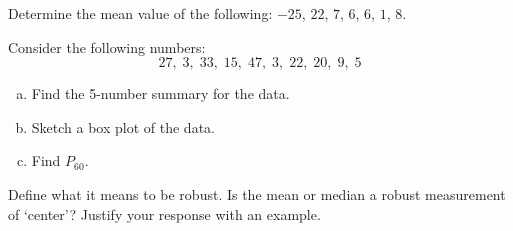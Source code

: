 \documentclass[11pt,letterpaper]{article}
\begin{document}

 Determine the mean value of the following: $-25$, $22$, $7$, $6$, $6$, $1$, $8$. 



\newpage



 Consider the following numbers:
	\[
	27, \; 3, \; 33, \; 15, \; 47, \; 3, \; 22, \; 20, \; 9, \; 5
	\]
\begin{enumerate}[(a)]
\item Find the 5-number summary for the data.
\item Sketch a box plot of the data.
\item Find $P_{60}$. 
\end{enumerate}



\newpage



 Define what it means to be robust. Is the mean or median a robust measurement of `center'? Justify your response with an example. 
\end{document}
